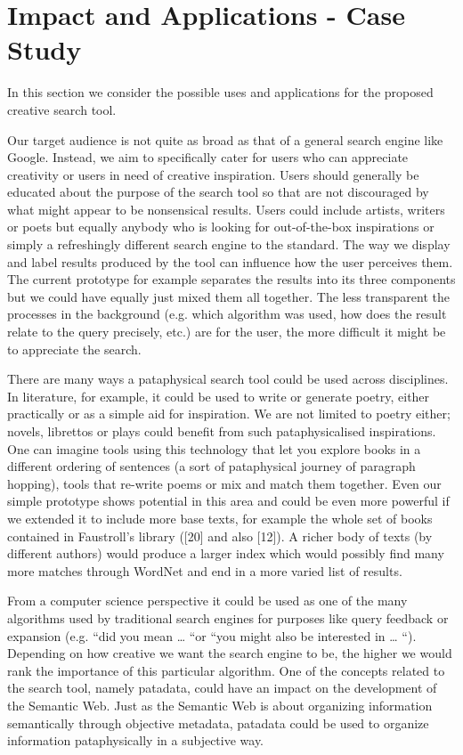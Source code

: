 
\chapter{Impact and Applications - Case Study}
\label{ch:study}

In this section we consider the possible uses and applications for the proposed creative search tool.

Our target audience is not quite as broad as that of a general search engine like Google. Instead, we aim to specifically cater for users who can appreciate creativity or users in need of creative inspiration. Users should generally be educated about the purpose of the search tool so that are not discouraged by what might appear to be nonsensical results. Users could include artists, writers or poets but equally anybody who is looking for out-of-the-box inspirations or simply a refreshingly different search engine to the standard.
The way we display and label results produced by the tool can influence how the user perceives them. The current prototype for example separates the results into its three components but we could have equally just mixed them all together. The less transparent the processes in the background (e.g. which algorithm was used, how does the result relate to the query precisely, etc.) are for the user, the more difficult it might be to appreciate the search.

There are many ways a pataphysical search tool could be used across disciplines.
In literature, for example, it could be used to write or generate poetry, either practically or as a simple aid for inspiration. We are not limited to poetry either; novels, librettos or plays could benefit from such pataphysicalised inspirations. One can imagine tools using this technology that let you explore books in a different ordering of sentences (a sort of pataphysical journey of paragraph hopping), tools that re-write poems or mix and match them together. Even our simple prototype shows potential in this area and could be even more powerful if we extended it to include more base texts, for example the whole set of books contained in Faustroll’s library ([20] and also [12]). A richer body of texts (by different authors) would produce a larger index which would possibly find many more matches through WordNet and end in a more varied list of results.

From a computer science perspective it could be used as one of the many algorithms used by traditional search engines for purposes like query feedback or expansion (e.g. “did you mean … “or “you might also be interested in … “). Depending on how creative we want the search engine to be, the higher we would rank the importance of this particular algorithm. One of the concepts related to the search tool, namely patadata, could have an impact on the development of the Semantic Web. Just as the Semantic Web is about organizing information semantically through objective metadata, patadata could be used to organize information pataphysically in a subjective way.

